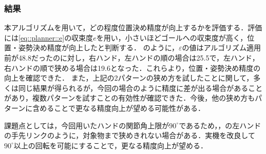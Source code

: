 \documentclass[a4paper,twoside,12pt,papersize, dvipdfmx]{iirthesis}
\begin{document}
\subsubsection{結果}
本アルゴリズムを用いて，どの程度位置決め精度が向上するかを評価する．評価には\eqref{eq::planner::e}の収束度$e$を用い，小さいほどゴールへの収束度が高く，位置・姿勢決め精度が向上したと判断する．
のように，$\varepsilon$の値はアルゴリズム適用前が48.8だったのに対し，右ハンド，左ハンドの順の場合は25.5で，左ハンド，右ハンドの順で狭める場合は19.6となった．これらより，位置・姿勢決め精度の向上を確認できた．
また，上記の2パターンの狭め方を試したことに関して，多くは同じ結果が得られるが，今回の場合のように精度に差が出る場合があることがあり，複数パターンを試すことの有効性が確認できた．今後，他の狭め方もパターンに含めることで更なる精度向上が望める可能性がある．　\par
課題点としては，今回用いたハンドの関節角上限が$90^{\circ}$であるため，，の左ハンドの手先リンクのように，対象物まで狭めきれない場合がある．実機を改良して$90^{\circ}$以上の回転を可能にすることで，更なる精度向上が望める．
\end{document}
